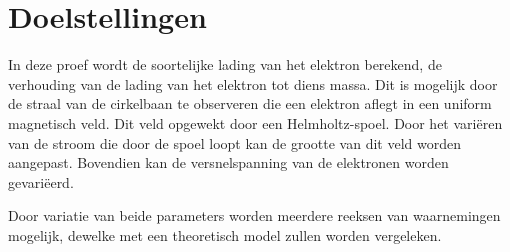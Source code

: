 \section{Doelstellingen}

In deze proef wordt de soortelijke lading van het elektron berekend, de 
verhouding van de lading van het elektron tot diens massa. Dit is mogelijk door 
de straal van de cirkelbaan te observeren die een elektron aflegt in een 
uniform magnetisch veld. Dit veld opgewekt door een Helmholtz-spoel.  Door het 
vari\"eren van de stroom die door de spoel loopt kan de grootte van dit veld 
worden aangepast. Bovendien kan de versnelspanning van de elektronen worden 
gevari\"eerd.

Door variatie van beide parameters worden meerdere reeksen van waarnemingen 
mogelijk, dewelke met een theoretisch model zullen worden vergeleken.
